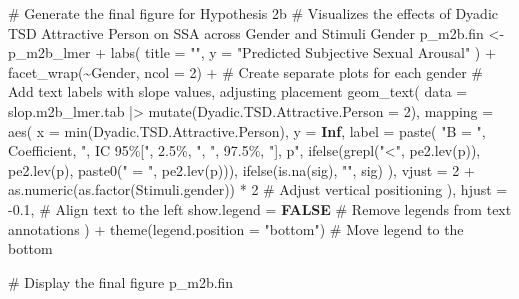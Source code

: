 \documentclass[
  bookmarksnumbered]{article}
\newenvironment{Shaded}{\begin{snugshade}}{\end{snugshade}}
\newcommand{\AttributeTok}[1]{\textcolor[rgb]{0.80,0.80,0.80}{#1}}
\newcommand{\CommentTok}[1]{\textcolor[rgb]{0.50,0.62,0.50}{#1}}
\newcommand{\ConstantTok}[1]{\textcolor[rgb]{0.86,0.64,0.64}{\textbf{#1}}}
\newcommand{\DecValTok}[1]{\textcolor[rgb]{0.86,0.86,0.80}{#1}}
\newcommand{\FloatTok}[1]{\textcolor[rgb]{0.75,0.75,0.82}{#1}}
\newcommand{\FunctionTok}[1]{\textcolor[rgb]{0.94,0.94,0.56}{#1}}
\newcommand{\NormalTok}[1]{\textcolor[rgb]{0.80,0.80,0.80}{#1}}
\newcommand{\OtherTok}[1]{\textcolor[rgb]{0.94,0.94,0.56}{#1}}
\newcommand{\SpecialCharTok}[1]{\textcolor[rgb]{0.86,0.64,0.64}{#1}}
\newcommand{\StringTok}[1]{\textcolor[rgb]{0.80,0.58,0.58}{#1}}
\begin{document}
\begin{Shaded}
\begin{Highlighting}[]
\CommentTok{\# Generate the final figure for Hypothesis 2b}
\CommentTok{\# Visualizes the effects of Dyadic TSD Attractive Person on SSA across Gender and Stimuli Gender}
\NormalTok{p\_m2b.fin }\OtherTok{\textless{}{-}}\NormalTok{ p\_m2b\_lmer }\SpecialCharTok{+}
  \FunctionTok{labs}\NormalTok{(}
    \AttributeTok{title =} \StringTok{""}\NormalTok{,}
    \AttributeTok{y =} \StringTok{"Predicted Subjective Sexual Arousal"}
\NormalTok{  ) }\SpecialCharTok{+}
  \FunctionTok{facet\_wrap}\NormalTok{(}\SpecialCharTok{\textasciitilde{}}\NormalTok{Gender, }\AttributeTok{ncol =} \DecValTok{2}\NormalTok{) }\SpecialCharTok{+} \CommentTok{\# Create separate plots for each gender}
  \CommentTok{\# Add text labels with slope values, adjusting placement}
  \FunctionTok{geom\_text}\NormalTok{(}
    \AttributeTok{data =}\NormalTok{ slop.m2b\_lmer.tab }\SpecialCharTok{|\textgreater{}} \FunctionTok{mutate}\NormalTok{(}\AttributeTok{Dyadic.TSD.Attractive.Person =} \DecValTok{2}\NormalTok{),}
    \AttributeTok{mapping =} \FunctionTok{aes}\NormalTok{(}
      \AttributeTok{x =} \FunctionTok{min}\NormalTok{(Dyadic.TSD.Attractive.Person), }\AttributeTok{y =} \ConstantTok{Inf}\NormalTok{,}
      \AttributeTok{label =} \FunctionTok{paste}\NormalTok{(}
        \StringTok{"B = "}\NormalTok{, Coefficient, }\StringTok{", IC 95\%["}\NormalTok{, }\StringTok{\textasciigrave{}}\AttributeTok{2.5\%}\StringTok{\textasciigrave{}}\NormalTok{, }\StringTok{", "}\NormalTok{, }\StringTok{\textasciigrave{}}\AttributeTok{97.5\%}\StringTok{\textasciigrave{}}\NormalTok{, }\StringTok{"], p"}\NormalTok{,}
        \FunctionTok{ifelse}\NormalTok{(}\FunctionTok{grepl}\NormalTok{(}\StringTok{"\textless{}"}\NormalTok{, }\FunctionTok{pe2.lev}\NormalTok{(p)), }\FunctionTok{pe2.lev}\NormalTok{(p), }\FunctionTok{paste0}\NormalTok{(}\StringTok{" = "}\NormalTok{, }\FunctionTok{pe2.lev}\NormalTok{(p))),}
        \FunctionTok{ifelse}\NormalTok{(}\FunctionTok{is.na}\NormalTok{(sig), }\StringTok{""}\NormalTok{, sig)}
\NormalTok{      ),}
      \AttributeTok{vjust =} \DecValTok{2} \SpecialCharTok{+} \FunctionTok{as.numeric}\NormalTok{(}\FunctionTok{as.factor}\NormalTok{(Stimuli.gender)) }\SpecialCharTok{*} \DecValTok{2} \CommentTok{\# Adjust vertical positioning}
\NormalTok{    ),}
    \AttributeTok{hjust =} \SpecialCharTok{{-}}\FloatTok{0.1}\NormalTok{, }\CommentTok{\# Align text to the left}
    \AttributeTok{show.legend =} \ConstantTok{FALSE} \CommentTok{\# Remove legends from text annotations}
\NormalTok{  ) }\SpecialCharTok{+}
  \FunctionTok{theme}\NormalTok{(}\AttributeTok{legend.position =} \StringTok{"bottom"}\NormalTok{) }\CommentTok{\# Move legend to the bottom}

\CommentTok{\# Display the final figure}
\NormalTok{p\_m2b.fin}
\end{Highlighting}
\end{Shaded}
\end{document}
